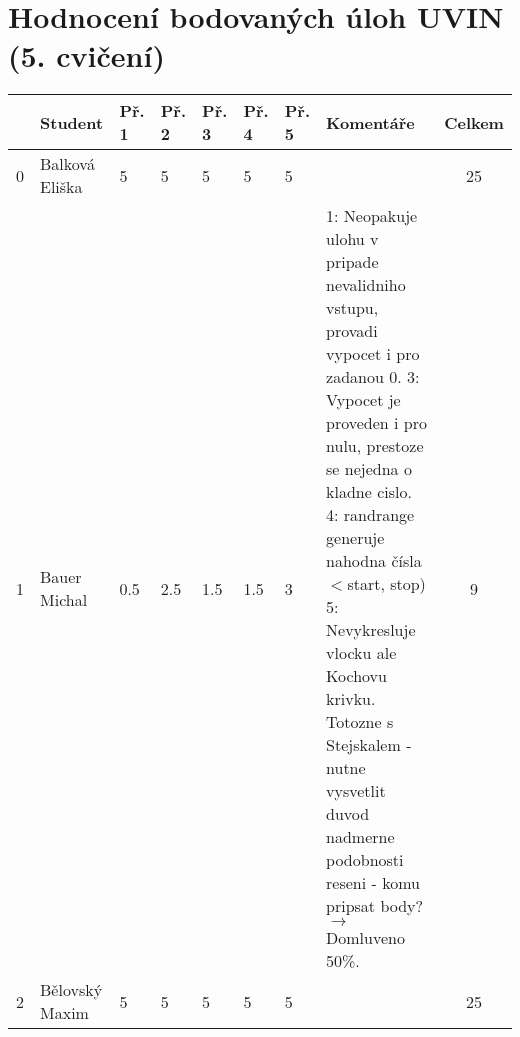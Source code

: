 \documentclass[landscape, 12pt]{article}
\begin{document}
\section*{Hodnocení bodovaných úloh UVIN (5. cvičení)}
       
        \begin{longtable}{|l l | C{0.7cm} | C{0.7cm} | C{0.7cm} | C{0.7cm} | C{0.7cm} | L{15cm} |c|}
\hline
    & Student            &   Př. 1 &   Př. 2 &   Př. 3 &   Př. 4 &   Př. 5 & Komentáře                                                                                                                                                                                                                                                                                                                                                                               &   Celkem \\
 & Balková Eliška     &       5 &       5 &       5 &       5 &       5 &                                                                                                                                                                                                                                                                                                                                                                                      &       25 \\
\hline

  1 & Bauer Michal       &       0.5 &       2.5 &       1.5 &       1.5 &       3 & 1: Neopakuje ulohu v pripade nevalidniho vstupu, provadi vypocet i pro zadanou 0. 3: Vypocet je proveden i pro nulu, prestoze se nejedna o kladne cislo. 4: randrange generuje nahodna čísla \ensuremath{<}start, stop) 5: Nevykresluje vlocku ale Kochovu krivku. Totozne s Stejskalem - nutne vysvetlit duvod nadmerne podobnosti reseni - komu pripsat body? $\rightarrow$ Domluveno 50\%.                                                                                                                                                        &       9 \\
\hline

  2 & Bělovský Maxim     &       5 &       5 &       5 &       5 &       5 &                                                                                                                                                                                                                                                                                                                                                                                      &       25 \\


\end{longtable}
\end{document}
